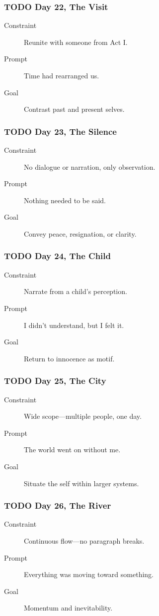 \documentclass[11pt]{article}
\begin{document}
\subsubsection*{{\bfseries\sffamily TODO} Day 22, The Visit}
\label{sec:orged9ca46}
\begin{description}
\item[{Constraint}] Reunite with someone from Act I.
\item[{Prompt}] Time had rearranged us.
\item[{Goal}] Contrast past and present selves.
\end{description}
\subsubsection*{{\bfseries\sffamily TODO} Day 23, The Silence}
\label{sec:org8ebf8a9}
\begin{description}
\item[{Constraint}] No dialogue or narration, only observation.
\item[{Prompt}] Nothing needed to be said.
\item[{Goal}] Convey peace, resignation, or clarity.
\end{description}
\subsubsection*{{\bfseries\sffamily TODO} Day 24, The Child}
\label{sec:orgfe8fd45}
\begin{description}
\item[{Constraint}] Narrate from a child’s perception.
\item[{Prompt}] I didn’t understand, but I felt it.
\item[{Goal}] Return to innocence as motif.
\end{description}
\subsubsection*{{\bfseries\sffamily TODO} Day 25, The City}
\label{sec:org662a460}
\begin{description}
\item[{Constraint}] Wide scope—multiple people, one day.
\item[{Prompt}] The world went on without me.
\item[{Goal}] Situate the self within larger systems.
\end{description}
\subsubsection*{{\bfseries\sffamily TODO} Day 26, The River}
\label{sec:org5bef754}
\begin{description}
\item[{Constraint}] Continuous flow—no paragraph breaks.
\item[{Prompt}] Everything was moving toward something.
\item[{Goal}] Momentum and inevitability.
\end{description}
\end{document}
